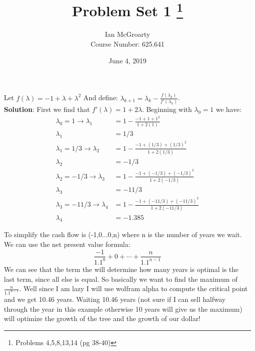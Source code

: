 \documentclass[12pt]{article}
\title{Problem Set 1 \thanks{Problems 4,5,8,13,14 (pg 38-40)}}
\author{Ian McGroarty \\
	Course Number: 625.641}
\date{June 4, 2019}
\newenvironment{problem}[2][Problem]{\begin{trivlist}
\item[\hskip \labelsep {\bfseries #1}\hskip \labelsep {\bfseries #2.}]}{\end{trivlist}}
\begin{document}
\maketitle
\newpage

\begin{problem}{2.4} Let $ f(\lambda ) = -1 + \lambda + \lambda^2 $ And define: $ \lambda_{k+1} = \lambda_k - \frac{f(\lambda_k)}{f'(\lambda_k)}$. \\
\textbf{Solution}: First we find that $f'(\lambda) = 1+2\lambda $. Beginning with $\lambda_0 = 1$ we have: 
\begin{align*} 
\lambda_0 = 1 \rightarrow \lambda_{1} &= 1- \frac{-1+1+1^2}{1+2(1)} \\
						\lambda_{1}	&= 1/3 \\ 
\lambda_1 = 1/3 \rightarrow  \lambda_{2} &= 1- \frac{-1+(1/3)+(1/3)^2}{1+2(1/3)} \\
						\lambda_{2}	&= -1/3 \\
\lambda_2 = -1/3 \rightarrow  \lambda_{3} &= 1- \frac{-1+(-1/3)+(-1/3)^2}{1+2(-1/3)} \\
					\lambda_{3} &= -11/3 \\
\lambda_3 = -11/3 \rightarrow  \lambda_{4} &= 1- \frac{-1+(-11/3)+(-11/3)^2}{1+2(-11/3)} \\
					\lambda_{4}&= -1.385 
\end{align*}
\end{problem}

\begin{problem}{2.5} To simplify the cash flow is (-1,0...0,n) where n is the number of years we wait. We can use the net present value formula: 
$$\frac{-1}{1.1^0} + 0 + \cdots + \frac{n}{1.1^{n-1}}$$
We can see that the term the will determine how many years is optimal is the last term, since all else is equal. So basically we want to find the maximum of $ \frac{n}{1.1^{n-1}}$. Well since I am lazy I will use wolfram alpha to compute the critical point and we get 10.46 years. Waiting 10.46 years (not sure if I can sell halfway through the year in this example otherwise 10 years will give us the maximum) will optimize the growth of the tree and the growth of our dollar!
\end{problem} 
\end{document}
